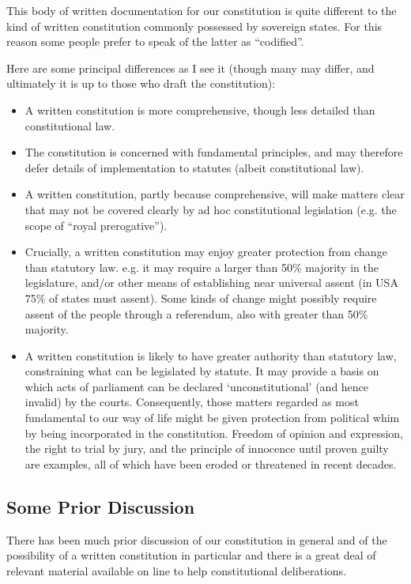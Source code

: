 \documentclass[14pt,titlepage]{extarticle}
\begin{document}
This body of written documentation for our constitution is quite different to the kind of written constitution commonly possessed by sovereign states.
For this reason some people prefer to speak of the latter as ``codified''.

Here are some principal differences as I see it (though many may differ, and ultimately it is up to those who draft the constitution):

\begin{itemize}
\item A written constitution is more comprehensive, though less detailed than constitutional law.
\item The constitution is concerned with fundamental principles, and may therefore defer details of implementation to statutes (albeit constitutional law).
\item A written constitution, partly because comprehensive, will make matters clear that may not be covered clearly by ad hoc constitutional legislation (e.g. the scope of ``royal prerogative'').
\item Crucially, a written constitution may enjoy greater protection from change than statutory law.
  e.g. it may require a larger than 50\% majority in the legislature, and/or other means of establishing near universal assent (in USA 75\% of states must assent).
  Some kinds of change might possibly require assent of the people through a referendum, also with greater than 50\% majority.
  
\item A written constitution is likely to have greater authority than statutory law, constraining what can be legislated by statute.
  It may provide a basis on which acts of parliament can be declared `unconstitutional' (and hence invalid) by the courts.
  Consequently, those matters regarded as most fundamental to our way of life might be given protection from political whim by being incorporated in the constitution.
  Freedom of opinion and expression, the right to trial by jury, and the principle of innocence until proven guilty are examples, all of which have been eroded or threatened in recent decades. 
\end{itemize}

\subsection{Some Prior Discussion}

There has been much prior discussion of our constitution in general and of the possibility of a written constitution in particular and there is a great deal of relevant material available on line to help constitutional deliberations.
\end{document}
